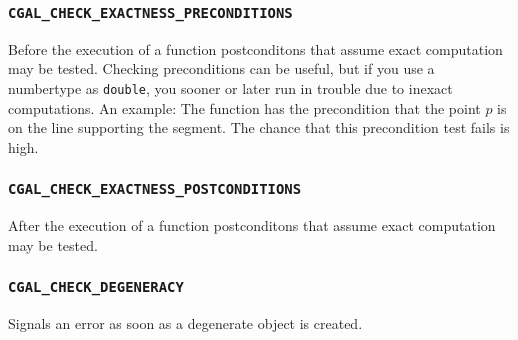 \subsubsection*{{\tt CGAL\_CHECK\_EXACTNESS\_PRECONDITIONS}}
Before the execution of a function postconditons that assume exact
computation may be tested.  Checking preconditions can be useful, but
if you use a numbertype as {\tt double}, you sooner or later run in
trouble due to inexact computations. An example: The function
 has
the precondition that the point $p$ is on the line supporting
the segment. The chance that this precondition test fails is high.

\subsubsection*{{\tt CGAL\_CHECK\_EXACTNESS\_POSTCONDITIONS}}
After the execution of a function postconditons that assume exact
computation may be tested.

\subsubsection*{{\tt CGAL\_CHECK\_DEGENERACY}}
Signals an error as soon as a degenerate object is created.


